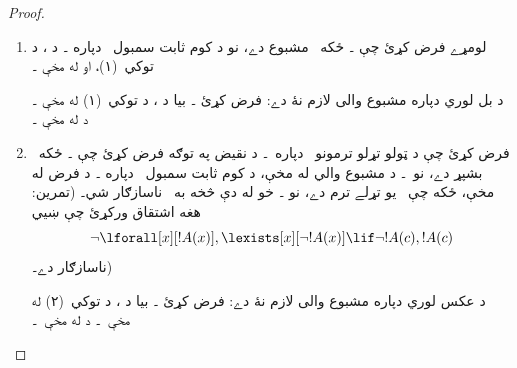 \documentclass[12pt,a4paper,oneside]{report}
\theoremstyle{definition}
\begin{document}
\label{olpseg:OLP-0130-B020:start}
\begin{proof}
  \begin{enumerate}
  \item %
    لومړے فرض کړئ چې
      \LR{$\lexists[x][!A(x)] \in \Gamma$}۔ ځکه~\LR{$\Gamma$} مشبوع دے، نو
      د کوم ثابت سمبول~ دپاره
      ۔ د
      ، د توکي~(۱)،
      او  له مخې
      ۔
\label{olpseg:OLP-0130-B020:end}

\label{olpseg:OLP-0130-B021:start}
د بل لوري دپاره مشبوع والی لازم نۀ دے: فرض کړئ
    ۔ بيا د
      ، د توکي~(۱) له مخې
    \LR{$\Gamma \Proves \lexists[x][!A(x)]$}۔ د
     له مخې
    \LR{$\lexists[x][!A(x)] \in \Gamma$}۔
  \item %
    فرض کړئ چې د ټولو تړلو ترمونو~
      دپاره~۔ د نقيض په توګه فرض کړئ چې
      \LR{$\lforall[x][!A(x)] \notin \Gamma$}۔ ځکه~\LR{$\Gamma$} بشپړ دے،
      نو~\LR{$\lnot\lforall[x][!A(x)] \in \Gamma$}۔ د مشبوع والي له مخې،
      د کوم ثابت سمبول~ دپاره
      ۔ د فرض له مخې، ځکه چې~ يو تړلے ترم دے، نو
      ۔ خو له دې څخه به~\LR{$\Gamma$} ناسازګار شي۔
      (تمرين: هغه اشتقاق ورکړئ چې ښيي
      \[
      \lnot \lforall[x][!A(x)],
      \lexists[x][\lnot !A(x)] \lif \lnot
        !A(c), !A(c)
      \]
      ناسازګار دے۔)
\label{olpseg:OLP-0130-B021:end}

\label{olpseg:OLP-0130-B022:start}
د عکس لوري دپاره مشبوع والی لازم نۀ دے: فرض کړئ
      \LR{$\lforall[x][!A(x)] \in \Gamma$}۔ بيا د
      ،
      د توکي~(۲) له مخې~۔ د
       له مخې~۔
  \end{enumerate}
\end{proof}
\label{olpseg:OLP-0130-B022:end}
\end{document}
